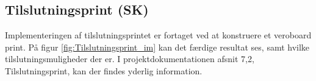 \subsection{Tilslutningsprint (SK)}

Implementeringen af tilslutningsprintet er fortaget ved at konstruere et veroboard print. På figur \ref{fig:Tilslutningsprint_im} kan det færdige resultat ses, samt hvilke tilslutningsmuligheder der er. I projektdokumentationen afsnit 7,2, Tilslutningsprint, kan der findes yderlig information.  


